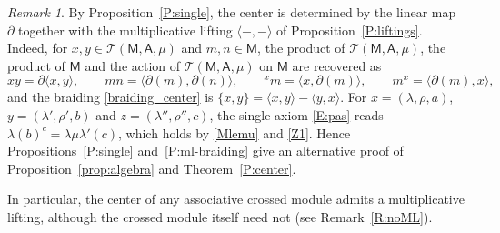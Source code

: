 \documentclass[12pt,reqno]{amsart}
\theoremstyle{plain}
\theoremstyle{definition}
\theoremstyle{remark}
\newtheorem{remark}[theorem]{Remark}
\def\lam{\lambda}
\newcommand{\A}{\ensuremath{\mathsf{A}}}
\newcommand{\MM}{\ensuremath{\mathsf{M}}}
\newcommand{\T}{\ensuremath{\mathcal{T}}}
\numberwithin{equation}{section}
\begin{document}
\begin{remark}\label{R:center-lifting}
	By Proposition~\ref{P:single}, the center is determined by the linear map $\partial$ together with the multiplicative lifting $\langle-,-\rangle$ of Proposition~\ref{P:liftings}. Indeed, for $x,y\in\T(\MM,\A,\mu)$ and $m,n\in\MM$, the product of $\T(\MM,\A,\mu)$, the product of $\MM$ and the action of $\T(\MM,\A,\mu)$ on $\MM$ are recovered as
	\[
	xy=\partial\langle x,y\rangle,\qquad mn=\langle\partial(m),\partial(n)\rangle,\qquad {}^{x}m=\langle x,\partial(m)\rangle,\qquad m^{x}=\langle\partial(m),x\rangle,
	\]
	and the braiding \eqref{braiding_center} is $\{x,y\}=\langle x,y\rangle-\langle y,x\rangle$. For $x=(\lam,\rho,a)$, $y=(\lam',\rho',b)$ and $z=(\lam'',\rho'',c)$, the single axiom \eqref{E:pas} reads $\lam(b)^c=\lam\mu\lam'(c)$, which holds by \eqref{Mlemu} and \eqref{Z1}. Hence Propositions~\ref{P:single} and~\ref{P:ml-braiding} give an alternative proof of Proposition~\ref{prop:algebra} and Theorem~\ref{P:center}.

	In particular, the center of any associative crossed module admits a multiplicative lifting, although the crossed module itself need not (see Remark~\ref{R:noML}).
\end{remark}
\end{document}
